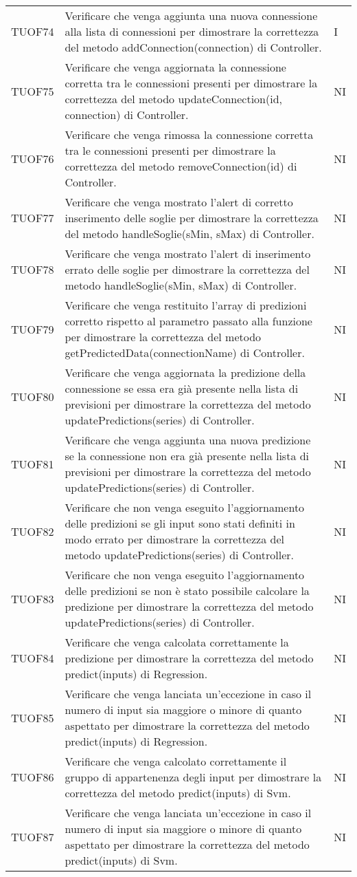\begin{longtable}{C{2cm} L{8cm} C{2cm}}
TUOF74 & Verificare che venga aggiunta una nuova connessione alla lista di connessioni per dimostrare la correttezza del metodo addConnection(connection) di Controller. & I \\
TUOF75 & Verificare che venga aggiornata la connessione corretta tra le connessioni presenti per dimostrare la correttezza del metodo updateConnection(id, connection) di Controller. & NI \\
TUOF76 & Verificare che venga rimossa la connessione corretta tra le connessioni presenti per dimostrare la correttezza del metodo removeConnection(id) di Controller. & NI \\
TUOF77 & Verificare che venga mostrato l'alert di corretto inserimento delle soglie per dimostrare la correttezza del metodo handleSoglie(sMin, sMax) di Controller. & NI \\
TUOF78 & Verificare che venga mostrato l'alert di inserimento errato delle soglie per dimostrare la correttezza del metodo handleSoglie(sMin, sMax) di Controller. & NI \\
TUOF79 & Verificare che venga restituito l'array di predizioni corretto rispetto al parametro passato alla funzione per dimostrare la correttezza del metodo getPredictedData(connectionName) di Controller. & NI \\
TUOF80 & Verificare che venga aggiornata la predizione della connessione se essa era già presente nella lista di previsioni per dimostrare la correttezza del metodo updatePredictions(series) di Controller. & NI \\
TUOF81 & Verificare che venga aggiunta una nuova predizione se la connessione non era già presente nella lista di previsioni per dimostrare la correttezza del metodo updatePredictions(series) di Controller. & NI \\
TUOF82 & Verificare che non venga eseguito l'aggiornamento delle predizioni se gli input sono stati definiti in modo errato per dimostrare la correttezza del metodo updatePredictions(series) di Controller. & NI \\
TUOF83 & Verificare che non venga eseguito l'aggiornamento delle predizioni se non è stato possibile calcolare la predizione per dimostrare la correttezza del metodo updatePredictions(series) di Controller. & NI \\
TUOF84 & Verificare che venga calcolata correttamente la predizione per dimostrare la correttezza del metodo predict(inputs) di Regression. & NI \\
TUOF85 & Verificare che venga lanciata un'eccezione in caso il numero di input sia maggiore o minore di quanto aspettato per dimostrare la correttezza del metodo predict(inputs) di Regression. & NI \\
TUOF86 & Verificare che venga calcolato correttamente il gruppo di appartenenza degli input per dimostrare la correttezza del metodo predict(inputs) di Svm. & NI \\
TUOF87 & Verificare che venga lanciata un'eccezione in caso il numero di input sia maggiore o minore di quanto aspettato per dimostrare la correttezza del metodo predict(inputs) di Svm. & NI \\


\end{longtable}
